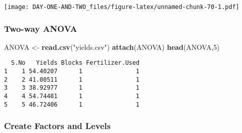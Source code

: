 \documentclass[
]{article}
\newenvironment{Shaded}{\begin{snugshade}}{\end{snugshade}}
\newcommand{\AttributeTok}[1]{\textcolor[rgb]{0.13,0.29,0.53}{#1}}
\newcommand{\DecValTok}[1]{\textcolor[rgb]{0.00,0.00,0.81}{#1}}
\newcommand{\FunctionTok}[1]{\textcolor[rgb]{0.13,0.29,0.53}{\textbf{#1}}}
\newcommand{\NormalTok}[1]{#1}
\newcommand{\OtherTok}[1]{\textcolor[rgb]{0.56,0.35,0.01}{#1}}
\newcommand{\SpecialCharTok}[1]{\textcolor[rgb]{0.81,0.36,0.00}{\textbf{#1}}}
\newcommand{\StringTok}[1]{\textcolor[rgb]{0.31,0.60,0.02}{#1}}
\begin{document}
\texttt{[image: DAY-ONE-AND-TWO\_files/figure-latex/unnamed-chunk-70-1.pdf]}

\hypertarget{two-way-anova}{%
\subsubsection{Two-way ANOVA}\label{two-way-anova}}

\begin{Shaded}
\begin{Highlighting}[]
\NormalTok{ANOVA }\OtherTok{\textless{}{-}} \FunctionTok{read.csv}\NormalTok{(}\StringTok{"yields.csv"}\NormalTok{)}
\FunctionTok{attach}\NormalTok{(ANOVA)}
\FunctionTok{head}\NormalTok{(ANOVA,}\DecValTok{5}\NormalTok{)}
\end{Highlighting}
\end{Shaded}

\begin{verbatim}
  S.No   Yields Blocks Fertilizer.Used
1    1 54.40207      1               1
2    2 41.00511      1               1
3    3 38.92977      1               1
4    4 54.74481      1               1
5    5 46.72406      1               1
\end{verbatim}

\hypertarget{create-factors-and-levels}{%
\subsubsection{Create Factors and
Levels}\label{create-factors-and-levels}}

\begin{Shaded}
\end{Shaded}
\end{document}
